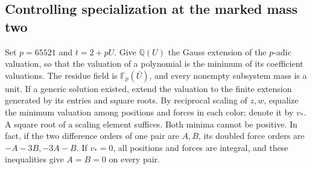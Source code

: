 \documentclass[11pt,letterpaper]{article}
\theoremstyle{definition}
\begin{document}
\subsection{Controlling specialization at the marked mass two}

Set $p=65521$ and $t=2+pU$. Give $\mathbb Q(U)$ the Gauss extension
of the $p$-adic valuation, so that the valuation of a polynomial is the
minimum of its coefficient valuations. The residue field is
$\mathbb F_p(\bar U)$, and every nonempty subsystem mass is a unit.
If a generic solution existed, extend the valuation to the finite
extension generated by its entries and square roots. By reciprocal
scaling of $z,w$, equalize the minimum valuation among positions and
forces in each color; denote it by $v_*$. A square root of a scaling
element suffices. Both minima cannot be positive. In fact, if the two
difference orders of one pair are $A,B$, its doubled force orders are
$-A-3B,-3A-B$. If $v_*=0$, all positions and forces are integral,
and these inequalities give $A=B=0$ on every pair.
\end{document}
